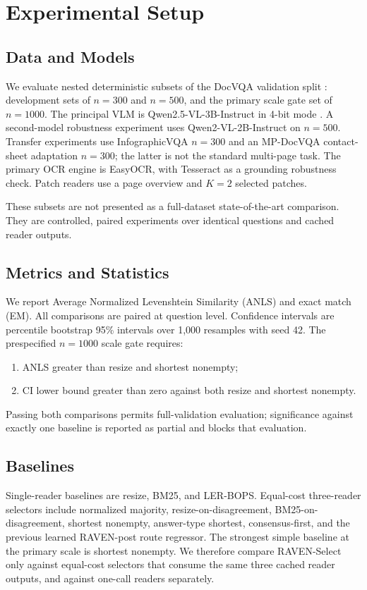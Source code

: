 \documentclass[journal]{IEEEtran}
\begin{document}
\section{Experimental Setup}
\subsection{Data and Models}
We evaluate nested deterministic subsets of the DocVQA validation split
\cite{docvqa}: development sets of $n=300$ and $n=500$, and the primary scale
gate set of $n=1000$.  The principal VLM is Qwen2.5-VL-3B-Instruct in 4-bit
mode \cite{qwen25vl}.  A second-model robustness experiment uses
Qwen2-VL-2B-Instruct on $n=500$.  Transfer experiments use InfographicVQA
$n=300$ and an MP-DocVQA contact-sheet adaptation $n=300$; the latter is not
the standard multi-page task.  The primary OCR engine is EasyOCR, with
Tesseract as a grounding robustness check.  Patch readers use a page overview
and $K=2$ selected patches.

These subsets are not presented as a full-dataset state-of-the-art comparison.
They are controlled, paired experiments over identical questions and cached
reader outputs.

\subsection{Metrics and Statistics}
We report Average Normalized Levenshtein Similarity (ANLS) and exact match (EM).
All comparisons are paired at question level.  Confidence intervals are
percentile bootstrap 95\% intervals over 1,000 resamples with seed 42.  The
prespecified $n=1000$ scale gate requires:
\begin{enumerate}[leftmargin=*]
  \item ANLS greater than resize and shortest nonempty;
  \item CI lower bound greater than zero against both resize and shortest
  nonempty.
\end{enumerate}
Passing both comparisons permits full-validation evaluation; significance
against exactly one baseline is reported as partial and blocks that evaluation.

\subsection{Baselines}
Single-reader baselines are resize, BM25, and LER-BOPS.  Equal-cost
three-reader selectors include normalized majority, resize-on-disagreement,
BM25-on-disagreement, shortest nonempty, answer-type shortest,
consensus-first, and the previous learned RAVEN-post route regressor.  The
strongest simple baseline at the primary scale is shortest nonempty.
We therefore compare RAVEN-Select only against equal-cost selectors that
consume the same three cached reader outputs, and against one-call readers
separately.
\end{document}

